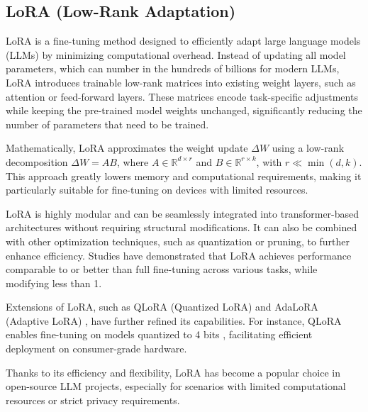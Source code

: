 

\subsection{LoRA (Low-Rank Adaptation)}     %


LoRA \cite{Hu2021LoRA} is a fine-tuning method designed to efficiently adapt large language models (LLMs) by minimizing computational overhead. Instead of updating all model parameters, which can number in the hundreds of billions for modern LLMs, LoRA introduces trainable low-rank matrices into existing weight layers, such as attention or feed-forward layers. These matrices encode task-specific adjustments while keeping the pre-trained model weights unchanged, significantly reducing the number of parameters that need to be trained.

Mathematically, LoRA approximates the weight update $\Delta W$ using a low-rank decomposition $\Delta W = A B$, where $A \in \mathbb{R}^{d \times r}$ and $B \in \mathbb{R}^{r \times k}$, with $r \ll \min(d,k)$. This approach greatly lowers memory and computational requirements, making it particularly suitable for fine-tuning on devices with limited resources.

LoRA is highly modular and can be seamlessly integrated into transformer-based architectures without requiring structural modifications. It can also be combined with other optimization techniques, such as quantization or pruning, to further enhance efficiency. Studies have demonstrated that LoRA achieves performance comparable to or better than full fine-tuning across various tasks, while modifying less than 1.%

Extensions of LoRA, such as QLoRA (Quantized LoRA) and AdaLoRA (Adaptive LoRA) \cite{Dettmers2023QLoRA, Zhang2023AdaLora}, have further refined its capabilities. For instance, QLoRA enables fine-tuning on models quantized to 4 bits \cite{Dettmers2023QLoRA}, facilitating efficient deployment on consumer-grade hardware.

Thanks to its efficiency and flexibility, LoRA has become a popular choice in open-source LLM projects, especially for scenarios with limited computational resources or strict privacy requirements.


